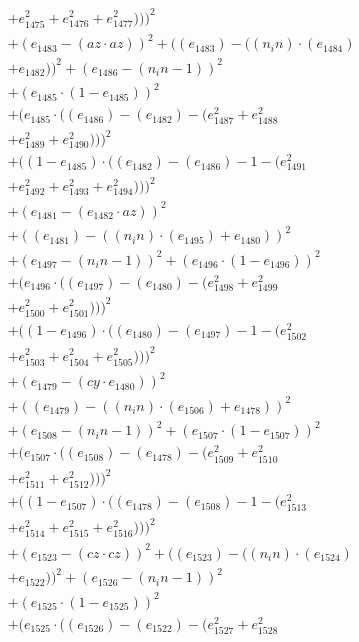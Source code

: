 \documentclass[10pt, a4paper]{article}
\begin{document}
\begin{align*}
& + e_{1475}^{2} + e_{1476}^{2} + e_{1477}^{2})))^{2} \\
& + (e_{1483} - (az  \cdot  az))^{2} + ((e_{1483}) - ((n_in)  \cdot  (e_{1484}) \\
& + e_{1482}))^{2} + (e_{1486} - (n_in - 1))^{2} \\
& + (e_{1485}  \cdot  (1 - e_{1485}))^{2} \\
& + (e_{1485}  \cdot  ((e_{1486}) - (e_{1482}) - (e_{1487}^{2} + e_{1488}^{2} \\
& + e_{1489}^{2} + e_{1490}^{2})))^{2} \\
& + ((1 - e_{1485})  \cdot  ((e_{1482}) - (e_{1486}) - 1 - (e_{1491}^{2} \\
& + e_{1492}^{2} + e_{1493}^{2} + e_{1494}^{2})))^{2} \\
& + (e_{1481} - (e_{1482}  \cdot  az))^{2} \\
& + ((e_{1481}) - ((n_in)  \cdot  (e_{1495}) + e_{1480}))^{2} \\
& + (e_{1497} - (n_in - 1))^{2} + (e_{1496}  \cdot  (1 - e_{1496}))^{2} \\
& + (e_{1496}  \cdot  ((e_{1497}) - (e_{1480}) - (e_{1498}^{2} + e_{1499}^{2} \\
& + e_{1500}^{2} + e_{1501}^{2})))^{2} \\
& + ((1 - e_{1496})  \cdot  ((e_{1480}) - (e_{1497}) - 1 - (e_{1502}^{2} \\
& + e_{1503}^{2} + e_{1504}^{2} + e_{1505}^{2})))^{2} \\
& + (e_{1479} - (cy  \cdot  e_{1480}))^{2} \\
& + ((e_{1479}) - ((n_in)  \cdot  (e_{1506}) + e_{1478}))^{2} \\
& + (e_{1508} - (n_in - 1))^{2} + (e_{1507}  \cdot  (1 - e_{1507}))^{2} \\
& + (e_{1507}  \cdot  ((e_{1508}) - (e_{1478}) - (e_{1509}^{2} + e_{1510}^{2} \\
& + e_{1511}^{2} + e_{1512}^{2})))^{2} \\
& + ((1 - e_{1507})  \cdot  ((e_{1478}) - (e_{1508}) - 1 - (e_{1513}^{2} \\
& + e_{1514}^{2} + e_{1515}^{2} + e_{1516}^{2})))^{2} \\
& + (e_{1523} - (cz  \cdot  cz))^{2} + ((e_{1523}) - ((n_in)  \cdot  (e_{1524}) \\
& + e_{1522}))^{2} + (e_{1526} - (n_in - 1))^{2} \\
& + (e_{1525}  \cdot  (1 - e_{1525}))^{2} \\
& + (e_{1525}  \cdot  ((e_{1526}) - (e_{1522}) - (e_{1527}^{2} + e_{1528}^{2} \\

\end{align*}
\end{document}
